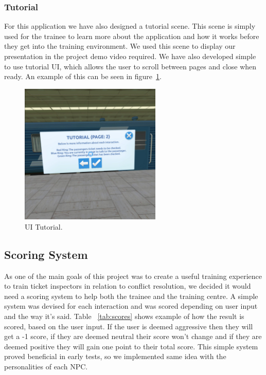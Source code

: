 \newpage

\subsubsection{Tutorial}
For this application we have also designed a tutorial scene. This scene is simply used for the trainee to learn more about the application and how it works before they get into the training environment. We used this scene to display our presentation in the project demo video required. We have also developed simple to use tutorial UI, which allows the user to scroll between pages and close when ready. An example of this can be seen in figure~\ref{image:tutorial}.

\begin{figure}[h!]
	\caption{UI Tutorial.}
	\label{image:tutorial}
	\centering
	\includegraphics[width=0.6\textwidth]{Images/Tutorial.jpg}
\end{figure}

\newpage

\subsection{Scoring System}
As one of the main goals of this project was to create a useful training experience to train ticket inspectors in relation to conflict resolution, we decided it would need a scoring system to help both the trainee and the training centre. A simple system was devised for each interaction and was scored depending on user input and the way it's said. Table ~\ref{tab:scores} shows example of how the result is scored, based on the user input. If the user is deemed aggressive then they will get a -1 score, if they are deemed neutral their score won't change and if they are deemed positive they will gain one point to their total score. This simple system proved beneficial in early tests, so we implemented same idea with the personalities of each NPC.

